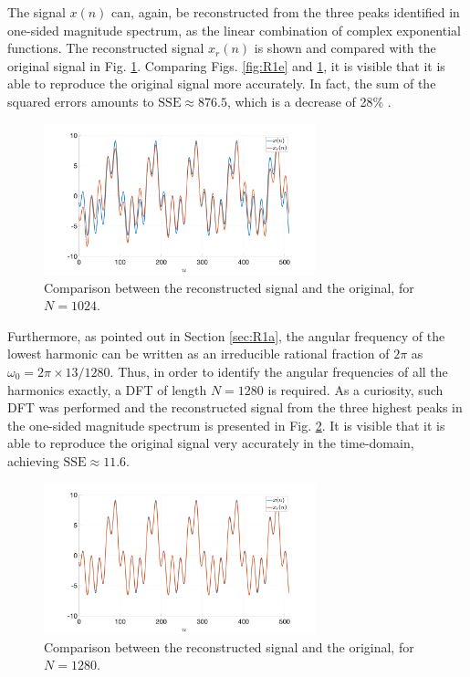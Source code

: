 \documentclass[a4paper, oneside, 11pt]{article}
\begin{document}
The signal $x(n)$ can, again, be reconstructed from the three peaks identified in one-sided magnitude spectrum, as the linear combination of complex exponential functions. The reconstructed signal $x_r(n)$ is shown and compared with the original signal in Fig. \ref{fig:R1f}. Comparing Figs. \ref{fig:R1e} and \ref{fig:R1f}, it is visible that it is able to reproduce the original signal more accurately. In fact, the sum of the squared errors amounts to $\mathrm{SSE} \approx 876.5$, which is a decrease of 28\% .

\begin{figure}[htbp]
	\centering
	\includegraphics[width= 0.7\textwidth]{figures/R1f.png}
	\caption{Comparison between the reconstructed signal and the original, for $N = 1024$.}
	\label{fig:R1f}
\end{figure}

Furthermore, as pointed out in Section \ref{sec:R1a}, the angular frequency of the lowest harmonic can be written as an irreducible rational fraction of $2\pi$ as $\omega_0 = 2\pi \times 13/1280$. Thus, in order to identify the angular frequencies of all the harmonics exactly, a DFT of length $N = 1280$ is required. As a curiosity, such DFT was performed and the reconstructed signal from the three highest peaks in the one-sided magnitude spectrum is presented in Fig. \ref{fig:R1f_1280}. It is visible that it is able to reproduce the original signal very accurately in the time-domain, achieving $\mathrm{SSE} \approx 11.6$.

\begin{figure}[htbp]
	\centering
	\includegraphics[width= 0.7\textwidth]{figures/R1f_1280.png}
	\caption{Comparison between the reconstructed signal and the original, for $N = 1280$.}
	\label{fig:R1f_1280}
\end{figure}
\end{document}
